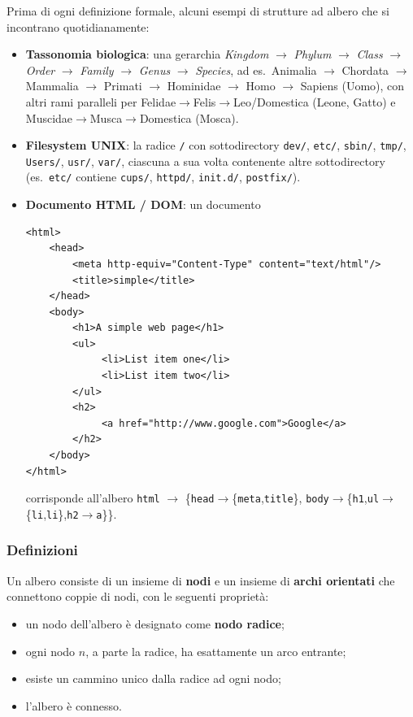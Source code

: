 \documentclass[12pt, a4paper]{article}
\begin{document}
Prima di ogni definizione formale, alcuni esempi di strutture ad albero che si incontrano quotidianamente:
\begin{itemize}
    \item \textbf{Tassonomia biologica}: una gerarchia \textit{Kingdom} $\to$ \textit{Phylum} $\to$ \textit{Class} $\to$ \textit{Order} $\to$ \textit{Family} $\to$ \textit{Genus} $\to$ \textit{Species}, ad es.\ Animalia $\to$ Chordata $\to$ Mammalia $\to$ Primati $\to$ Hominidae $\to$ Homo $\to$ Sapiens (Uomo), con altri rami paralleli per Felidae$\to$Felis$\to$Leo/Domestica (Leone, Gatto) e Muscidae$\to$Musca$\to$Domestica (Mosca).
    \item \textbf{Filesystem UNIX}: la radice \texttt{/} con sottodirectory \texttt{dev/}, \texttt{etc/}, \texttt{sbin/}, \texttt{tmp/}, \texttt{Users/}, \texttt{usr/}, \texttt{var/}, ciascuna a sua volta contenente altre sottodirectory (es.\ \texttt{etc/} contiene \texttt{cups/}, \texttt{httpd/}, \texttt{init.d/}, \texttt{postfix/}).
    \item \textbf{Documento HTML / DOM}: un documento
\begin{verbatim}
<html>
    <head>
        <meta http-equiv="Content-Type" content="text/html"/>
        <title>simple</title>
    </head>
    <body>
        <h1>A simple web page</h1>
        <ul>
             <li>List item one</li>
             <li>List item two</li>
        </ul>
        <h2>
             <a href="http://www.google.com">Google</a>
        </h2>
    </body>
</html>
\end{verbatim}
    corrisponde all'albero \texttt{html} $\to$ \{\texttt{head}$\to$\{\texttt{meta},\texttt{title}\}, \texttt{body}$\to$\{\texttt{h1},\texttt{ul}$\to$\{\texttt{li},\texttt{li}\},\texttt{h2}$\to$\texttt{a}\}\}.
\end{itemize}

\subsubsection{Definizioni}

\begin{tcolorbox}[colback=lightergray!10, colframe=tocsec, title=\textbf{Albero Radicato -- Definizione 1}]
\label{def:albero-radicato-1}
Un albero consiste di un insieme di \textbf{nodi} e un insieme di \textbf{archi orientati} che connettono coppie di nodi, con le seguenti proprietà:
\begin{itemize}
    \item un nodo dell'albero è designato come \textbf{nodo radice};
    \item ogni nodo $n$, a parte la radice, ha esattamente un arco entrante;
    \item esiste un cammino unico dalla radice ad ogni nodo;
    \item l'albero è connesso.
\end{itemize}
\end{tcolorbox}
\end{document}

